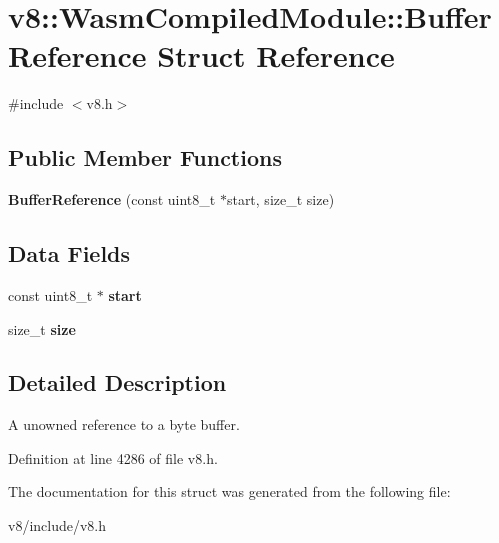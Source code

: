 \hypertarget{structv8_1_1WasmCompiledModule_1_1BufferReference}{}\section{v8\+:\+:Wasm\+Compiled\+Module\+:\+:Buffer\+Reference Struct Reference}
\label{structv8_1_1WasmCompiledModule_1_1BufferReference}


{\ttfamily \#include $<$v8.\+h$>$}

\subsection*{Public Member Functions}
\begin{DoxyCompactItemize}
\item 
\mbox{\label{structv8_1_1WasmCompiledModule_1_1BufferReference_ad46931134873606a9847ca2b5c464ec7}} 
{\bfseries Buffer\+Reference} (const uint8\+\_\+t $\ast$start, size\+\_\+t size)
\end{DoxyCompactItemize}
\subsection*{Data Fields}
\begin{DoxyCompactItemize}
\item 
\mbox{\label{structv8_1_1WasmCompiledModule_1_1BufferReference_a9ac4a0945b75f31d78b7b799571d1c62}} 
const uint8\+\_\+t $\ast$ {\bfseries start}
\item 
\mbox{\label{structv8_1_1WasmCompiledModule_1_1BufferReference_a8ea480c872a380496cd7f44c56f542cf}} 
size\+\_\+t {\bfseries size}
\end{DoxyCompactItemize}


\subsection{Detailed Description}
A unowned reference to a byte buffer. 

Definition at line 4286 of file v8.\+h.



The documentation for this struct was generated from the following file\+:\begin{DoxyCompactItemize}
\item 
v8/include/v8.\+h\end{DoxyCompactItemize}
